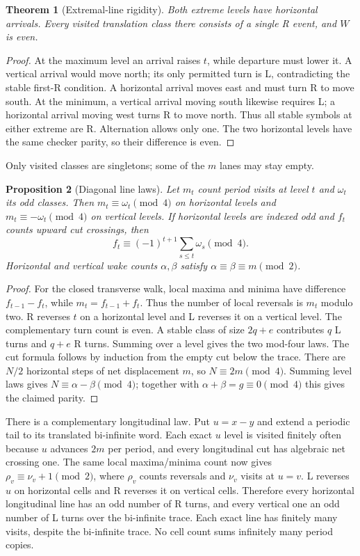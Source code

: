 \documentclass[11pt,letterpaper]{article}
\newtheorem{theorem}{Theorem}[section]
\newtheorem{proposition}[theorem]{Proposition}
\begin{document}
\begin{theorem}[Extremal-line rigidity]\label{thm:rails}
Both extreme levels have horizontal arrivals. Every visited translation
class there consists of a single R event, and $W$ is even.
\end{theorem}
\begin{proof}
At the maximum level an arrival raises $t$, while departure must lower
it. A vertical arrival would move north; its only permitted turn is L,
contradicting the stable first-R condition. A horizontal arrival moves
east and must turn R to move south. At the minimum, a vertical arrival
moving south likewise requires L; a horizontal arrival moving west turns
R to move north. Thus all stable symbols at either extreme are R.
Alternation allows only one. The two horizontal levels have the same
checker parity, so their difference is even.
\end{proof}
Only visited classes are singletons; some of the $m$ lanes may stay empty.

\begin{proposition}[Diagonal line laws]\label{prop:line}
Let $m_t$ count period visits at level $t$ and $\omega_t$ its odd
classes. Then
$m_t\equiv\omega_t\pmod4$ on horizontal levels and
$m_t\equiv-\omega_t\pmod4$ on vertical levels.
If horizontal levels are indexed odd and $f_t$ counts upward cut
crossings, then
\[
f_t\equiv(-1)^{t+1}\sum_{s\le t}\omega_s\pmod4.
\]
Horizontal and vertical wake counts $\alpha,\beta$ satisfy
$\alpha\equiv\beta\equiv m\pmod2$.
\end{proposition}
\begin{proof}
For the closed transverse walk, local maxima and minima have difference
$f_{t-1}-f_t$, while $m_t=f_{t-1}+f_t$. Thus the number of local
reversals is $m_t$ modulo two. R reverses $t$ on a horizontal level
and L reverses it on a vertical level. The complementary turn count is
even. A stable class of size $2q+e$ contributes $q$ L turns and
$q+e$ R turns. Summing over a level gives the two mod-four laws.
The cut formula follows by induction from the empty cut below the trace.
There are $N/2$ horizontal steps of net displacement $m$, so
$N\equiv2m\pmod4$. Summing level laws gives
$N\equiv\alpha-\beta\pmod4$; together with
$\alpha+\beta=g\equiv0\pmod4$ this gives the claimed parity.
\end{proof}


There is a complementary longitudinal law. Put $u=x-y$ and extend a
periodic tail to its translated bi-infinite word. Each exact $u$ level
is visited finitely often because $u$ advances $2m$ per period, and
every longitudinal cut has algebraic net crossing one. The same local
maxima/minima count now gives
$\rho_v\equiv\nu_v+1\pmod2$, where $\rho_v$ counts reversals
and $\nu_v$ visits at $u=v$. L reverses $u$ on horizontal cells and
R reverses it on vertical cells. Therefore every horizontal longitudinal
line has an odd number of R turns, and every vertical one an odd number
of L turns over the bi-infinite trace. Each exact line has finitely many visits, despite the bi-infinite trace.
No cell count sums infinitely many period copies.
\end{document}
